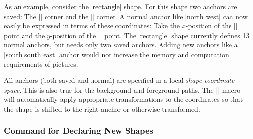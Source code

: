 As an example, consider the |rectangle| shape. For this shape two
anchors are saved: The |\northeast| corner and the |\southwest|
corner. A normal anchor like |north west| can now easily be expressed
in terms of these coordinates: Take the $x$-position of the
|\southwest| point  and the $y$-position of the |\northeast| point. 
The |rectangle| shape currently defines 13 normal anchors, but needs
only two saved anchors. Adding new anchors like a  |south south east|
anchor would not increase the memory and computation requirements of
pictures. 

All anchors (both saved and normal) are specified in a local
\emph{shape coordinate space}. This is also true for the background
and foreground paths. The |\pgfnode| macro will automatically apply
appropriate transformations to the coordinates so that the shape is
shifted to the right anchor or otherwise transformed. 


\subsubsection{Command for Declaring New Shapes}

